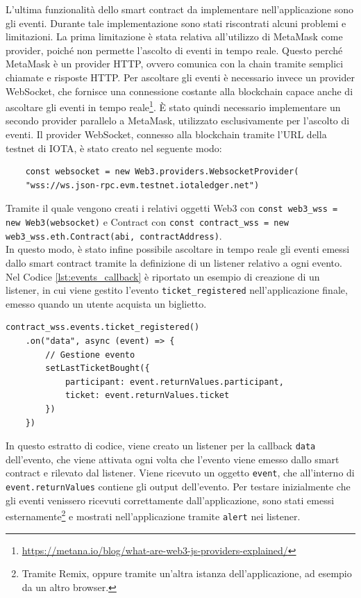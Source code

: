 \documentclass[12pt,a4paper,openright,twoside]{report}
\begin{document}
L'ultima funzionalità dello smart contract da implementare nell'applicazione sono gli eventi. Durante tale implementazione sono stati riscontrati alcuni problemi e limitazioni. La prima limitazione è stata relativa all'utilizzo di MetaMask come provider, poiché non permette l'ascolto di eventi in tempo reale. Questo perché MetaMask è un provider HTTP, ovvero comunica con la chain tramite semplici chiamate e risposte HTTP. Per ascoltare gli eventi è necessario invece un provider WebSocket, che fornisce una connessione costante alla blockchain capace anche di ascoltare gli eventi in tempo reale\footnote{\url{https://metana.io/blog/what-are-web3-js-providers-explained/}}. È stato quindi necessario implementare un secondo provider parallelo a MetaMask, utilizzato esclusivamente per l'ascolto di eventi. Il provider WebSocket, connesso alla blockchain tramite l'URL della testnet di IOTA, è stato creato nel seguente modo:
\begin{verbatim}
    const websocket = new Web3.providers.WebsocketProvider(
    "wss://ws.json-rpc.evm.testnet.iotaledger.net")
\end{verbatim}
Tramite il quale vengono creati i relativi oggetti Web3 con \texttt{const web3\_wss = new Web3(websocket)} e Contract con \texttt{const contract\_wss = new web3\_wss.eth.Contract(abi, contractAddress)}.\\
In questo modo, è stato infine possibile ascoltare in tempo reale gli eventi emessi dallo smart contract tramite la definizione di un listener relativo a ogni evento. Nel Codice \ref{lst:events_callback} è riportato un esempio di creazione di un listener, in cui viene gestito l'evento \texttt{ticket\_registered} nell'applicazione finale, emesso quando un utente acquista un biglietto.
\begin{lstlisting}[language=JSX, caption=Ricezione di un evento dello Smart Contract, label={lst:events_callback}]
    contract_wss.events.ticket_registered()
    .on("data", async (event) => { 
        // Gestione evento
        setLastTicketBought({
            participant: event.returnValues.participant, 
            ticket: event.returnValues.ticket
        })
    }) 
\end{lstlisting}
In questo estratto di codice, viene creato un listener per la callback \texttt{data} dell'evento, che viene attivata ogni volta che l'evento viene emesso dallo smart contract e rilevato dal listener. Viene ricevuto un oggetto \texttt{event}, che all'interno di \texttt{event.returnValues} contiene gli output dell'evento. Per testare inizialmente che gli eventi venissero ricevuti correttamente dall'applicazione, sono stati emessi esternamente\footnote{Tramite Remix, oppure tramite un'altra istanza dell'applicazione, ad esempio da un altro browser.} e mostrati nell'applicazione tramite \texttt{alert} nei listener.\\
\end{document}

